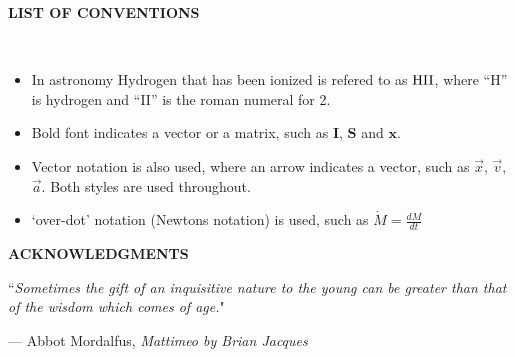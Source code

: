 \documentclass[12pt,notitlepage]{report}
\newcommand{\dblspc}{\setstretch{1.6}}
\newcommand{\HII}{\rm HII}
\begin{document}
\tableofcontents

\afterpreface

\newpage

\begin{center}
{\Large \bf LIST OF CONVENTIONS}
\end{center}
\ \\

\begin{itemize} 

\item In astronomy Hydrogen that has been ionized is refered to as $\HII$, where ``H'' is hydrogen and ``II'' is the roman numeral for 2. 

\item Bold font indicates a vector or a matrix, such as $\mathbf{I}$, $\mathbf{S}$ and $\mathbf{x}$.

\item Vector notation is also used, where an arrow indicates a vector, such as $\vec{x}$, $\vec{v}$, $\vec{a}$. Both styles are used throughout.

\item `over-dot' notation (Newtons notation) is used, such as $\dot{M} = \frac{dM}{dt}$

\end{itemize}

\dblspc %

\newpage


\begin{center}
{\Large \bf ACKNOWLEDGMENTS}
\end{center}


\singlespace
\epigraph{``\emph{Sometimes the gift of an inquisitive nature to the young can be greater than that of the wisdom which comes of age.}"}{--- \textup{Abbot Mordalfus}, \textit{Mattimeo by Brian Jacques}}
\end{document}
